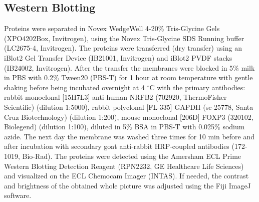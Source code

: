 \documentclass[oneside, 10pt, a4paper, twocolumn]{article}
\begin{document}
{%
\subsection{Western Blotting}
Proteins were separated in Novex WedgeWell 4-20$\%$ Tris-Glycine Gels (XPO4202Box, Invitrogen), using the Novex Tris-Glycine SDS Running buffer (LC2675-4, Invitrogen). The proteins were transferred (dry transfer) using an iBlot2 Gel Transfer Device (IB21001, Invitrogen) and iBlot2 PVDF stacks (IB24002, Invitrogen). After the transfer the membranes were blocked in 5$\%$ milk in PBS with 0.2$\%$ Tween20 (PBS-T) for 1 hour at room temperature with gentle shaking before being incubated overnight at 4 $^\circ$C with the primary antibodies: rabbit monoclonal [15H7L3] anti-human NRFB2 (702920, ThermoFisher Scientific) (dilution 1:5000), rabbit polyclonal [FL-335] GAPDH (sc-25778, Santa Cruz Biotechnology) (dilution 1:200), mouse monoclonal [206D] FOXP3 (320102, Biolegend) (dilution 1:100), diluted in 5$\%$ BSA in PBS-T with 0.025$\%$ sodium azide. The next day the membrane was washed three times for 10 min before and after incubation with secondary goat anti-rabbit HRP-coupled antibodies (172-1019, Bio-Rad). The proteins were detected using the Amersham ECL Prime Western Blotting Detection Reagent (RPN2232, GE Healthcare Life Sciences) and visualized on the ECL Chemocam Imager (INTAS). If needed, the contrast and brightness of the obtained whole picture was adjusted using the Fiji ImageJ software.


}
\end{document}
